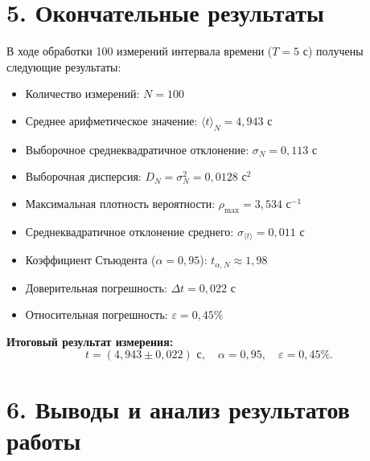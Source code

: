 \documentclass[a4paper,12pt]{article}
\begin{document}
\section*{\hspace{30pt} 5. Окончательные результаты}

В ходе обработки 100 измерений интервала времени ($T = 5\text{ с}$) получены следующие результаты:
\begin{itemize}
    \item Количество измерений: $N = 100$
    \item Среднее арифметическое значение: $\langle t\rangle_N = 4{,}943\text{ с}$
    \item Выборочное среднеквадратичное отклонение: $\sigma_N = 0{,}113\text{ с}$
    \item Выборочная дисперсия: $D_N = \sigma_N^2 = 0{,}0128\text{ с}^2$
    \item Максимальная плотность вероятности: $\rho_{\max} = 3{,}534\text{ с}^{-1}$
    \item Среднеквадратичное отклонение среднего: $\sigma_{\langle t\rangle} = 0{,}011\text{ с}$
    \item Коэффициент Стьюдента ($\alpha = 0{,}95$): $t_{\alpha, N} \approx 1{,}98$
    \item Доверительная погрешность: $\Delta t = 0{,}022\text{ с}$
    \item Относительная погрешность: $\varepsilon = 0{,}45\%$
\end{itemize}

\vspace{0.3cm}
\textbf{Итоговый результат измерения:}
\begin{equation*}
    t = (4{,}943 \pm 0{,}022)\text{ с}, \quad \alpha = 0{,}95, \quad \varepsilon = 0{,}45\%.
\end{equation*}

\newpage

\section*{\hspace{30pt} 6. Выводы и анализ результатов работы}
\end{document}
